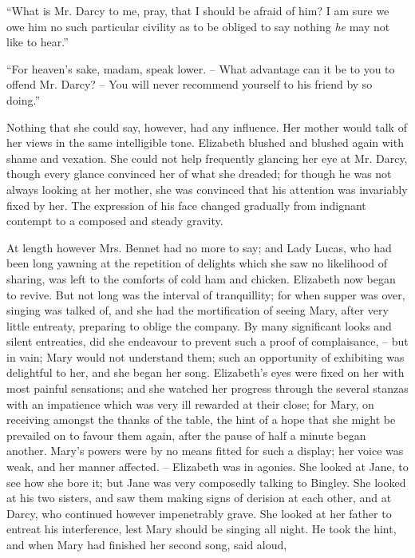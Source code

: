 “What is Mr. Darcy to me, pray, that I should be
afraid of him? I am sure we owe him no such particular
civility as to be obliged to say nothing \textit{he} may not like
to hear.”

“For heaven’s sake, madam, speak lower. -- What
advantage can it be to you to offend Mr. Darcy? -- You
will never recommend yourself to his friend by so doing.”

Nothing that she could say, however, had any influence.
Her mother would talk of her views in the same intelligible
tone. Elizabeth blushed and blushed again with shame
and vexation. She could not help frequently glancing her
eye at Mr. Darcy, though every glance convinced her of
what she dreaded; for though he was not always looking
at her mother, she was convinced that his attention was
invariably fixed by her. The expression of his face changed
gradually from indignant contempt to a composed and
steady gravity.

At length however Mrs. Bennet had no more to say;
and Lady Lucas, who had been long yawning at the
repetition of delights which she saw no likelihood of
sharing, was left to the comforts of cold ham and chicken.
Elizabeth now began to revive. But not long was the
interval of tranquillity; for when supper was over, singing
was talked of, and she had the mortification of seeing
Mary, after very little entreaty, preparing to oblige the
company. By many significant looks and silent entreaties,
did she endeavour to prevent such a proof of complaisance,
-- but in vain; Mary would not understand them; such
an opportunity of exhibiting was delightful to her, and
she began her song. Elizabeth’s eyes were fixed on her
with most painful sensations; and she watched her progress
through the several stanzas with an impatience which was
very ill rewarded at their close; for Mary, on receiving
amongst the thanks of the table, the hint of a hope that
she might be prevailed on to favour them again, after the
pause of half a minute began another. Mary’s powers
were by no means fitted for such a display; her voice
was weak, and her manner affected. -- Elizabeth was in
agonies. She looked at Jane, to see how she bore it; but
Jane was very composedly talking to Bingley. She looked
at his two sisters, and saw them making signs of derision
at each other, and at Darcy, who continued however
impenetrably grave. She looked at her father to entreat
his interference, lest Mary should be singing all night.
He took the hint, and when Mary had finished her second
song, said aloud,

